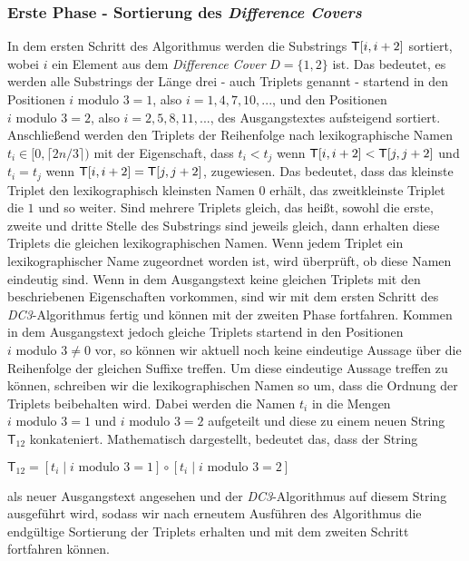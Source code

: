 \subsubsection{Erste Phase - Sortierung des \emph{Difference Covers}}
\label{dc3:algorithmus:phase1}

In dem ersten Schritt des Algorithmus werden die Substrings $\inputtext[i, i+2]$ sortiert, wobei $i$ ein Element aus dem \emph{Difference Cover} $D = \{1, 2\}$ ist. Das bedeutet, es werden alle Substrings der Länge drei - auch Triplets genannt - startend in den Positionen $i \text{ modulo } 3 = 1$, also $i = 1, 4, 7, 10,...$, und den Positionen $i \text{ modulo } 3 = 2$, also $i = 2, 5, 8, 11,...$, des Ausgangstextes  aufsteigend sortiert.
Anschließend werden den Triplets der Reihenfolge nach lexikographische Namen $t_i \in [0,\lceil2n/3\rceil)$ mit der Eigenschaft, dass $t_i < t_j$ wenn $\inputtext[i, i+2] < \inputtext[j, j+2]$ und $t_i = t_j$ wenn $\inputtext[i, i+2] = \inputtext[j, j+2]$, zugewiesen. Das bedeutet, dass das kleinste Triplet den lexikographisch kleinsten Namen $0$ erhält, das zweitkleinste Triplet die $1$ und so weiter. Sind mehrere Triplets gleich, das heißt, sowohl die erste, zweite und dritte Stelle des Substrings sind jeweils gleich, dann erhalten diese Triplets die gleichen lexikographischen Namen.
Wenn jedem Triplet ein lexikographischer Name zugeordnet worden ist, wird überprüft, ob diese Namen eindeutig sind. Wenn in dem Ausgangstext keine gleichen Triplets mit den beschriebenen Eigenschaften vorkommen, sind wir mit dem ersten Schritt des \emph{DC3}-Algorithmus fertig und können mit der zweiten Phase fortfahren. Kommen in dem Ausgangstext  jedoch gleiche Triplets startend in den Positionen $i \text{ modulo } 3 \neq 0$ vor, so können wir aktuell noch keine eindeutige Aussage über die Reihenfolge der gleichen Suffixe treffen. Um diese eindeutige Aussage treffen zu können, schreiben wir die lexikographischen Namen so um, dass die Ordnung der Triplets beibehalten wird. Dabei werden die Namen $t_i$ in die Mengen $i \text{ modulo } 3 = 1$ und $i \text{ modulo } 3 = 2$ aufgeteilt und diese zu einem neuen String $\mathsf{T}_{12}$ konkateniert. Mathematisch dargestellt, bedeutet das, dass der String
\begin{center}
	$\mathsf{T}_{12} = [t_i \mid i \text{ modulo } 3 = 1] \circ [t_i \mid i \text{ modulo } 3 = 2]$ 
\end{center}
als neuer Ausgangstext angesehen und der \emph{DC3}-Algorithmus auf diesem String ausgeführt wird, sodass wir nach erneutem Ausführen des Algorithmus die endgültige Sortierung der Triplets erhalten und mit dem zweiten Schritt fortfahren können.

